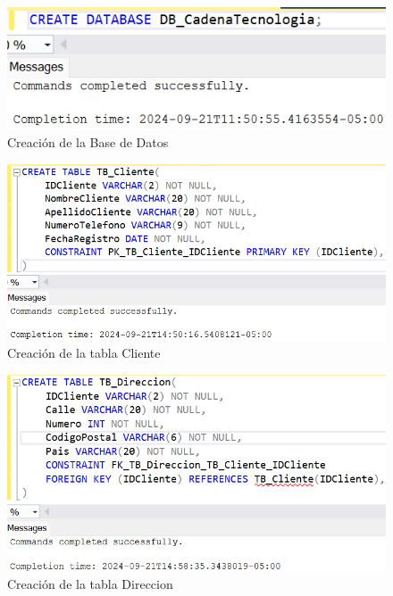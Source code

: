 \begin{figure}[H]
  \centering
  \includegraphics[scale = 1]{Imagenes/sql/1.creacion_db/crear_database.png}
  \caption{Creación de la Base de Datos}
\end{figure}

\begin{figure}[H]
  \centering
  \includegraphics[scale = 0.7]{Imagenes/sql/2.crear_tablas/creacion_tabla_cliente.png}
  \caption{Creación de la tabla Cliente}
\end{figure}

\begin{figure}[H]
  \centering
  \includegraphics[scale = 0.7]{Imagenes/sql/2.crear_tablas/creacion_tabla_direccion.png}
  \caption{Creación de la tabla Direccion}
\end{figure}

